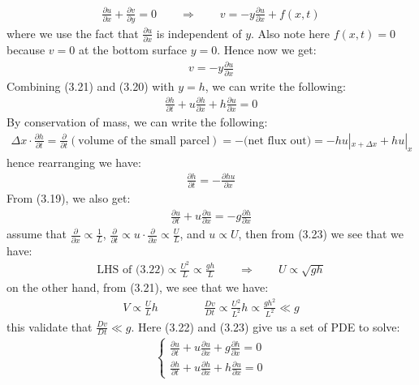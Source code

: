 \documentclass[11pt]{book}
\theoremstyle{break}
\theoremstyle{break}
\begin{document}
\begin{align*}
\frac{\partial u}{\partial x} + \frac{\partial v}{\partial y} = 0 \qquad \Rightarrow \qquad v = -y \frac{\partial u}{\partial x} + f(x,t)
\end{align*}
where we use the fact that $\frac{\partial u}{\partial x}$ is independent of $y$. Also note here $f(x,t) = 0$ because $v = 0$ at the bottom surface $y = 0$. Hence now we get:
\begin{align}
v = -y \frac{\partial u}{\partial x}
\end{align}
Combining (3.21) and (3.20) with $y = h$, we can write the following:
\begin{align}
\frac{\partial h}{\partial t} + u \frac{\partial h}{\partial x} + h \frac{\partial u}{\partial x} = 0
\end{align}
By conservation of mass, we can write the following:
\begin{align*}
\Delta x \cdot \frac{\partial h}{\partial t} = \frac{\partial }{\partial t}\left(\text{volume of the small parcel}\right) =- \text{(net flux out)} = -h u|_{x+\Delta x} + h u|_x
\end{align*}
hence rearranging we have:
\begin{align*}
\frac{\partial h}{\partial t} = -\frac{\partial hu}{\partial x}
\end{align*}
From (3.19), we also get:
\begin{align}
\frac{\partial u}{\partial t}+ u \frac{\partial u}{\partial x} = -g\frac{\partial h}{\partial x}
\end{align}
assume that $\frac{\partial }{\partial x} \propto \frac{1}{L}$, $\frac{\partial}{\partial t} \propto u \cdot \frac{\partial}{\partial x}\propto \frac{U}{L}$, and $u\propto U $, then from (3.23) we see that we have:
\begin{align*}
\text{LHS of (3.22)} \propto \frac{U^2}{L}\propto \frac{gh}{L} \qquad \Rightarrow \qquad U \propto \sqrt{gh}
\end{align*}
on the other hand, from (3.21), we see that we have:
\begin{align*}
V\propto \frac{U}{L}h \qquad\qquad \frac{Dv}{Dt} \propto \frac{U^2}{L^2}h \propto \frac{gh^2}{L^2} \ll g
\end{align*}
this validate that $\frac{Dv}{Dt} \ll g$. Here (3.22) and (3.23) give us a set of PDE to solve:
\begin{align}
\begin{cases}
\frac{\partial u}{\partial t}+ u \frac{\partial u}{\partial x} +g\frac{\partial h}{\partial x} = 0\\
\frac{\partial h}{\partial t}+ u \frac{\partial h}{\partial x}+ h \frac{\partial u}{\partial x} = 0
\end{cases}
\end{align}
\end{document}
